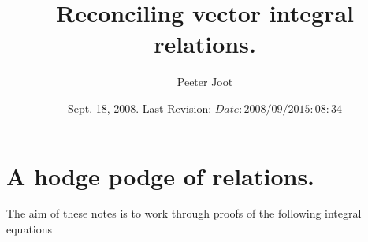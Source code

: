 \documentclass{article}
\title{ Reconciling vector integral relations. }
\author{Peeter Joot}
\date{ Sept. 18, 2008.  Last Revision: $Date: 2008/09/20 15:08:34 $ }
\begin{document}
\maketitle{}

\tableofcontents

\section{ A hodge podge of relations. }


The aim of these notes is to work through proofs of the following 
integral equations
\end{document}

